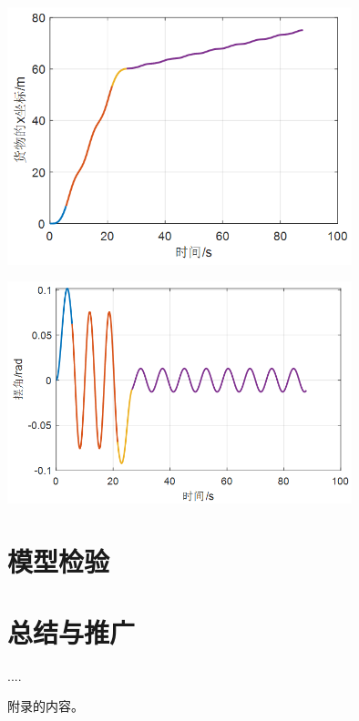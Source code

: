 \documentclass[withoutpreface,bwprint]{cumcmthesis} %
\begin{document}
\centerline{\includegraphics[width=10cm]{p2x.png}}
\centerline{\includegraphics[width=10cm]{p2theta.png}}

\section{模型检验}
\section{总结与推广}
\begin{thebibliography}{9}%
     ....
\end{thebibliography}
\begin{appendices}
    附录的内容。
\end{appendices}
\end{document}
